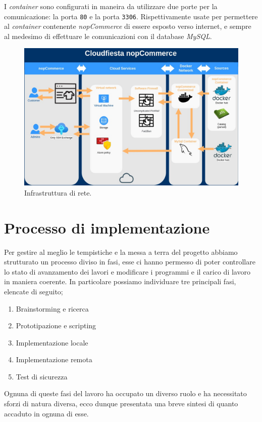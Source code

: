 \documentclass[a4paper]{report}
\begin{document}
		I \emph{container} sono configurati in maneira da utilizzare due porte per la comunicazione: la porta
		\texttt{80} e la porta \texttt{3306}. Rispettivamente usate per permettere al \emph{container} contenente
		\emph{nopCommerce} di essere esposto verso internet, e sempre al medesimo di effettuare le comunicazioni con il
		database \emph{MySQL}.

		\begin{figure}[H]
			\includegraphics[scale=0.3]{DiagrammaDiRete.jpg}
			\caption{Infrastruttura di rete.}\label{fig:architettura_di_rete}
		\end{figure}
 

\chapter{Processo di implementazione}\label{processo_di_implementazione}
	Per gestire al meglio le tempistiche e la messa a terra del progetto abbiamo strutturato un processo diviso in fasi,
	esse ci hanno permesso di poter controllare lo stato di avanzamento dei lavori e modificare i programmi e il carico
	di lavoro in maniera coerente. In particolare possiamo individuare tre principali fasi, elencate di seguito;
	\begin{enumerate}
		\item Brainstorming e ricerca
		\item Prototipazione e scripting
		\item Implementazione locale
		\item Implementazione remota
		\item Test di sicurezza
	\end{enumerate}
	Ognuna di queste fasi del lavoro ha occupato un diverso ruolo e ha necessitato sforzi di natura diversa, ecco dunque
	presentata una breve sintesi di quanto accaduto in ognuna di esse.
\end{document}

